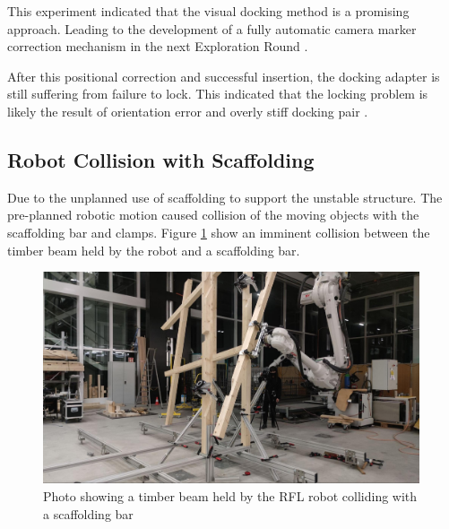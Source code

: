 This experiment indicated that the visual docking method is a promising approach. Leading to the development of a fully automatic camera marker correction mechanism in the next Exploration Round . 

After this positional correction and successful insertion, the docking adapter is still suffering from failure to lock. This indicated that the locking problem is likely the result of orientation error and overly stiff docking pair .

\subsection{Robot Collision with Scaffolding}
\label{subsection:exploration-3-robot-collision-with-scaffolding}

Due to the unplanned use of scaffolding to support the unstable structure. The pre-planned robotic motion caused collision of the moving objects with the scaffolding bar and clamps. Figure \ref{fig:robot-colliding-with-scaffolding-bar} show an imminent collision between the timber beam held by the robot and a scaffolding bar. 

\begin{figure}[!h]
    \centering
    \includegraphics[width=0.99\textwidth]{images/6b/img13.jpg}
    \caption{Photo showing a timber beam held by the RFL robot colliding with a scaffolding bar}
    \label{fig:robot-colliding-with-scaffolding-bar}
\end{figure}



